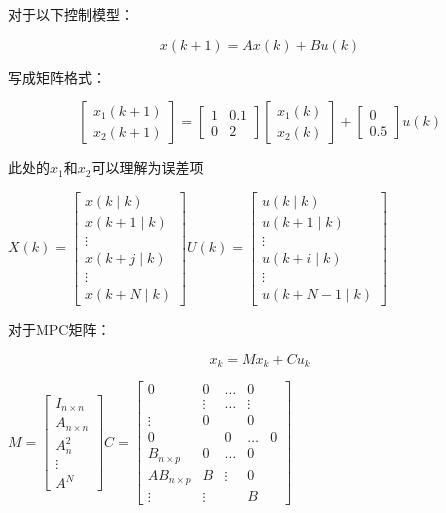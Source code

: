 对于以下控制模型：

$$
x(k+1)=A x(k)+B u(k)
$$

写成矩阵格式：

$$
\left[\begin{array}{l}x_{1}(k+1) \\x_{2}(k+1)\end{array}\right]=\left[\begin{array}{cc}1 & 0.1 \\0 & 2\end{array}\right]\left[\begin{array}{l}x_{1}(k) \\x_{2}(k)\end{array}\right]+\left[\begin{array}{c}0 \\0.5\end{array}\right] u(k)
$$

此处的$x_{1}$和$x_{2}$可以理解为误差项

$X(k)=\left[\begin{array}{c}x(k \mid k) \\x(k+1 \mid k) \\\vdots\\ x(k+j \mid k)\\\vdots \\x(k+N \mid k)\end{array}\right]$$U(k)=\left[\begin{array}{c}u(k \mid k) \\u(k+1 \mid k) \\\vdots\\ u(k+i \mid k)\\\vdots \\u(k+N-1 \mid k)\end{array}\right]$

对于MPC矩阵：

$$
x_{k}=M x_{k}+C u_{k}
$$

$M=\left[\begin{array}{c}I_{n \times n} \\A_{n \times n} \\A_{n}^{2} \\\vdots \\A^{N}\end{array}\right]$$C=\left[\begin{array}{cccc}
0 & 0 & \ldots & 0 \\
& \vdots & \ldots & \vdots \\
\vdots & 0 & & 0 \\
0 & & 0 & \ldots & 0 \\
B_{n \times p} & 0 & \ldots & 0 \\
A B_{n \times p} & B & \vdots & 0 \\
\vdots & \vdots & & B
\end{array}\right]$

